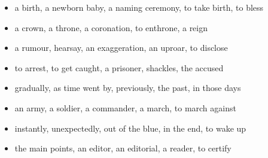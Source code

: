 \begin{itemize}
\raggedright
  \item a birth, a newborn baby, a naming ceremony, to take birth, to bless
  \item a crown, a throne, a coronation, to enthrone, a reign
  \item a rumour, hearsay, an exaggeration, an uproar, to disclose
  \item to arrest, to get caught, a prisoner, shackles, the accused
  \item gradually, as time went by, previously, the past, in those days
  \item an army, a soldier, a commander, a march, to march against
  \item instantly, unexpectedly, out of the blue, in the end, to wake up
  \item the main points, an editor, an editorial, a reader, to certify
\end{itemize}

